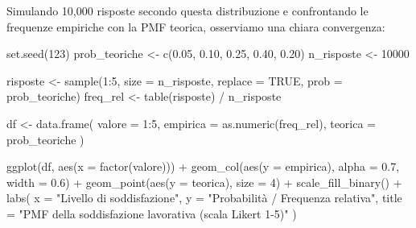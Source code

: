 \documentclass[
  italian,
  letterpaper,
  a4paper,
  11pt,
  open=any]{scrbook}
\newenvironment{Shaded}{\begin{snugshade}}{\end{snugshade}}
\newcommand{\AttributeTok}[1]{\textcolor[rgb]{0.40,0.45,0.13}{#1}}
\newcommand{\ConstantTok}[1]{\textcolor[rgb]{0.56,0.35,0.01}{#1}}
\newcommand{\DecValTok}[1]{\textcolor[rgb]{0.68,0.00,0.00}{#1}}
\newcommand{\FloatTok}[1]{\textcolor[rgb]{0.68,0.00,0.00}{#1}}
\newcommand{\FunctionTok}[1]{\textcolor[rgb]{0.28,0.35,0.67}{#1}}
\newcommand{\NormalTok}[1]{\textcolor[rgb]{0.00,0.23,0.31}{#1}}
\newcommand{\OtherTok}[1]{\textcolor[rgb]{0.00,0.23,0.31}{#1}}
\newcommand{\SpecialCharTok}[1]{\textcolor[rgb]{0.37,0.37,0.37}{#1}}
\newcommand{\StringTok}[1]{\textcolor[rgb]{0.13,0.47,0.30}{#1}}
\theoremstyle{plain}
\theoremstyle{definition}
\theoremstyle{definition}
\theoremstyle{remark}
\begin{document}
\begin{tcolorbox}
Simulando 10,000 risposte secondo questa distribuzione e confrontando le
frequenze empiriche con la PMF teorica, osserviamo una chiara
convergenza:

\begin{Shaded}
\begin{Highlighting}[]
\FunctionTok{set.seed}\NormalTok{(}\DecValTok{123}\NormalTok{)}
\NormalTok{prob\_teoriche }\OtherTok{\textless{}{-}} \FunctionTok{c}\NormalTok{(}\FloatTok{0.05}\NormalTok{, }\FloatTok{0.10}\NormalTok{, }\FloatTok{0.25}\NormalTok{, }\FloatTok{0.40}\NormalTok{, }\FloatTok{0.20}\NormalTok{)}
\NormalTok{n\_risposte }\OtherTok{\textless{}{-}} \DecValTok{10000}

\NormalTok{risposte }\OtherTok{\textless{}{-}} \FunctionTok{sample}\NormalTok{(}\DecValTok{1}\SpecialCharTok{:}\DecValTok{5}\NormalTok{, }\AttributeTok{size =}\NormalTok{ n\_risposte, }\AttributeTok{replace =} \ConstantTok{TRUE}\NormalTok{, }\AttributeTok{prob =}\NormalTok{ prob\_teoriche)}
\NormalTok{freq\_rel }\OtherTok{\textless{}{-}} \FunctionTok{table}\NormalTok{(risposte) }\SpecialCharTok{/}\NormalTok{ n\_risposte}

\NormalTok{df }\OtherTok{\textless{}{-}} \FunctionTok{data.frame}\NormalTok{(}
  \AttributeTok{valore =} \DecValTok{1}\SpecialCharTok{:}\DecValTok{5}\NormalTok{,}
  \AttributeTok{empirica =} \FunctionTok{as.numeric}\NormalTok{(freq\_rel),}
  \AttributeTok{teorica =}\NormalTok{ prob\_teoriche}
\NormalTok{)}

\FunctionTok{ggplot}\NormalTok{(df, }\FunctionTok{aes}\NormalTok{(}\AttributeTok{x =} \FunctionTok{factor}\NormalTok{(valore))) }\SpecialCharTok{+}
  \FunctionTok{geom\_col}\NormalTok{(}\FunctionTok{aes}\NormalTok{(}\AttributeTok{y =}\NormalTok{ empirica), }\AttributeTok{alpha =} \FloatTok{0.7}\NormalTok{, }\AttributeTok{width =} \FloatTok{0.6}\NormalTok{) }\SpecialCharTok{+}
  \FunctionTok{geom\_point}\NormalTok{(}\FunctionTok{aes}\NormalTok{(}\AttributeTok{y =}\NormalTok{ teorica), }\AttributeTok{size =} \DecValTok{4}\NormalTok{) }\SpecialCharTok{+}
  \FunctionTok{scale\_fill\_binary}\NormalTok{() }\SpecialCharTok{+}
  \FunctionTok{labs}\NormalTok{(}
    \AttributeTok{x =} \StringTok{"Livello di soddisfazione"}\NormalTok{, }
    \AttributeTok{y =} \StringTok{"Probabilità / Frequenza relativa"}\NormalTok{,}
    \AttributeTok{title =} \StringTok{"PMF della soddisfazione lavorativa (scala Likert 1{-}5)"}
\NormalTok{  ) }
\end{Highlighting}
\end{Shaded}


\end{tcolorbox}
\end{document}
